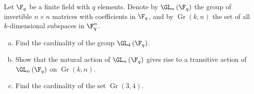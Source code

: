 \documentclass[10pt]{mypackage}
\begin{document}
\begin{problem}[Problem 2]
  Let $\F_q$ be a finite field with $q$ elements. Denote by $\GL_n\left( \F_q \right)$ the group of invertible $n\times n$ matrices with coefficients in $\F_q$, and by $\operatorname{Gr}\left( k,n \right)$ the set of all $k$-dimensional subspaces in $\F_q^{n}$.
  \begin{enumerate}[(a)]
    \item Find the cardinality of the group $\GL_4\left( \F_q \right)$.
    \item Show that the natural action of $\GL_n\left( \F_q \right)$ gives rise to a transitive action of $\GL_n\left( \F_q \right)$ on $\operatorname{Gr}\left( k,n \right)$.
    \item Find the cardinality of the set $\operatorname{Gr}\left( 3,4 \right)$.
  \end{enumerate}
\end{problem}
\end{document}
